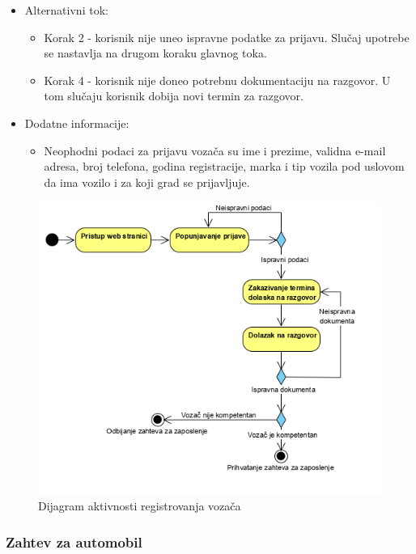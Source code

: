 \begin{itemize}
\begin{enumerate}
		\end{enumerate}
	\item Alternativni tok:
		\begin{itemize}
    		\item Korak 2 - korisnik nije uneo ispravne podatke za prijavu. Slučaj upotrebe se nastavlja na drugom koraku glavnog toka.
		    \item Korak 4 - korisnik nije doneo potrebnu dokumentaciju na razgovor. U tom slučaju korisnik dobija novi termin za razgovor.
		\end{itemize}
	\item Dodatne informacije:
		\begin{itemize}
			\item Neophodni podaci za prijavu vozača su ime i prezime, validna e-mail adresa, broj telefona, godina registracije, marka i tip vozila pod uslovom da ima vozilo i za koji grad se prijavljuje.
		\end{itemize}						
\end{itemize}

\begin{figure}[H]
\begin{center}
\includegraphics[width=\textwidth]{Slike/RegistracijaVozaca.png}
\end{center}
    \caption{Dijagram aktivnosti registrovanja vozača}
\label{fig:RegistracijaVozaca}
\end{figure}

\subsubsection{\bfseries Zahtev za automobil}

